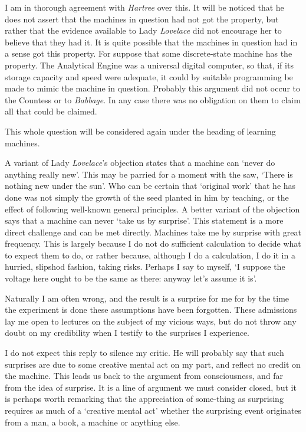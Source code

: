 \documentclass[10pt]{article} %
\begin{document}
I am in thorough agreement with \textit{Hartree} over this. It will be noticed that he does not assert that the machines in question had not got the property, but rather that the evidence available to Lady \textit{Lovelace} did not encourage her to believe that they had it. It is quite possible that the machines in question had in a sense got this property. For suppose that some discrete-state machine has the property. The Analytical Engine was a universal digital computer, so that, if its storage capacity and speed were adequate, it could by suitable programming be made to mimic the machine in question. Probably this argument did not occur to the Countess or to \textit{Babbage}. In any case there was no obligation on them to claim all that could be claimed.

This whole question will be considered again under the heading of learning machines.

A variant of Lady \textit{Lovelace}'s objection states that a machine can `never do anything really new'. This may be parried for a moment with the saw, `There is nothing new under the sun'. Who can be certain that `original work' that he has done was not simply the growth of the seed planted in him by teaching, or the effect of following well-known general principles. A better variant of the objection says that a machine can never `take us by surprise'. This statement is a more direct challenge and can be met directly. Machines take me by surprise with great frequency. This is largely because I do not do sufficient calculation to decide what to expect them to do, or rather because, although I do a calculation, I do it in a hurried, slipshod fashion, taking risks. Perhaps I say to myself, `I suppose the voltage here ought to be the same as there: anyway let's assume it is'.

Naturally I am often wrong, and the result is a surprise for me for by the time the experiment is done these assumptions have been forgotten. These admissions lay me open to lectures on the subject of my vicious ways, but do not throw any doubt on my credibility when I testify to the surprises I experience.

I do not expect this reply to silence my critic. He will probably say that such surprises are due to some creative mental act on my part, and reflect no credit on the machine. This leads us back to the argument from consciousness, and far from the idea of surprise. It is a line of argument we must consider closed, but it is perhaps worth remarking that the appreciation of some-thing as surprising requires as much of a `creative mental act' whether the surprising event originates from a man, a book, a machine or anything else.
\end{document}
